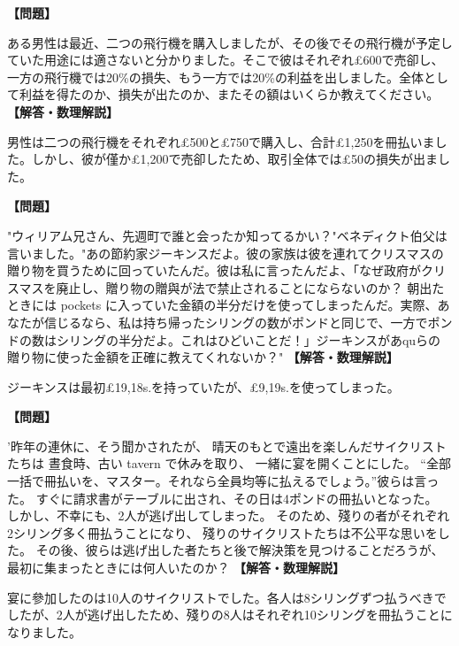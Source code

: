\documentclass[10pt,a4paper,oneside,openany]{ltjsbook}
\begin{document}
\begin{tcolorbox}[colback=softblue,colframe=primaryblue,title=\textbf{第 9 問：二機の飛行機 （原題: THE TWO AEROPLANES.）},arc=2mm,boxrule=1pt,breakable]
\textbf{【問題】}\par\vspace{0.3em}
ある男性は最近、二つの飛行機を購入しましたが、その後でその飛行機が予定していた用途には適さないと分かりました。そこで彼はそれぞれ£600で売卻し、一方の飛行機では20\%の損失、もう一方では20\%の利益を出しました。全体として利益を得たのか、損失が出たのか、またその額はいくらか教えてください。
\tcblower
\textbf{【解答・数理解説】}\par\vspace{0.3em}
男性は二つの飛行機をそれぞれ£500と£750で購入し、合計£1,250を冊払いました。しかし、彼が僅か£1,200で売卻したため、取引全体では£50の損失が出ました。
\end{tcolorbox}

\begin{tcolorbox}[colback=softblue,colframe=primaryblue,title=\textbf{第 10 問：贈り物を買う人 （原題: BUYING PRESENTS.）},arc=2mm,boxrule=1pt,breakable]
\textbf{【問題】}\par\vspace{0.3em}
"ウィリアム兄さん、先週町で誰と会ったか知ってるかい？"ベネディクト伯父は言いました。"あの節約家ジーキンスだよ。彼の家族は彼を連れてクリスマスの贈り物を買うために回っていたんだ。彼は私に言ったんだよ、「なぜ政府がクリスマスを廃止し、贈り物の贈與が法で禁止されることにならないのか？ 朝出たときには pockets に入っていた金額の半分だけを使ってしまったんだ。実際、あなたが信じるなら、私は持ち帰ったシリングの数がポンドと同じで、一方でポンドの数はシリングの半分だよ。これはひどいことだ！」ジーキンスがあquらの贈り物に使った金額を正確に教えてくれないか？"
\tcblower
\textbf{【解答・数理解説】}\par\vspace{0.3em}
ジーキンスは最初£19,18s.を持っていたが、£9,19s.を使ってしまった。
\end{tcolorbox}

\begin{tcolorbox}[colback=softblue,colframe=primaryblue,title=\textbf{第 11 問：サイクリストたちの宴 （原題: THE CYCLISTS' FEAST.）},arc=2mm,boxrule=1pt,breakable]
\textbf{【問題】}\par\vspace{0.3em}
'昨年の連休に、そう聞かされたが、
晴天のもとで遠出を楽しんだサイクリストたちは
晝食時、古い tavern で休みを取り、
一緒に宴を開くことにした。
“全部一括で冊払いを、マスター。それなら全員均等に払えるでしょう。”彼らは言った。
すぐに請求書がテーブルに出され、その日は4ポンドの冊払いとなった。
しかし、不幸にも、2人が逃げ出してしまった。
そのため、殘りの者がそれぞれ2シリング多く冊払うことになり、
殘りのサイクリストたちは不公平な思いをした。
その後、彼らは逃げ出した者たちと後で解決策を見つけることだろうが、
最初に集まったときには何人いたのか？
\tcblower
\textbf{【解答・数理解説】}\par\vspace{0.3em}
宴に參加したのは10人のサイクリストでした。各人は8シリングずつ払うべきでしたが、2人が逃げ出したため、殘りの8人はそれぞれ10シリングを冊払うことになりました。
\end{tcolorbox}
\end{document}
